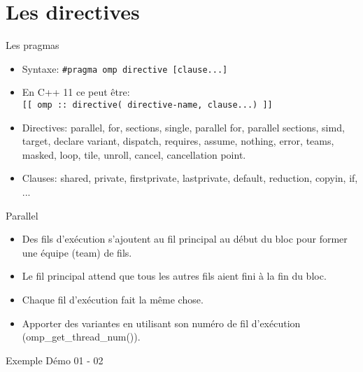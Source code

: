 \documentclass[10pt]{beamer}
\begin{document}
\section{Les directives}

\begin{frame}[fragile]{Les pragmas}

  \begin{itemize}
    \item Syntaxe: \texttt{\#pragma omp directive [clause...]}
    \item En C++ 11 ce peut être: \\\texttt{[[ omp :: directive( directive-name, clause...) ]]}
    \item Directives: parallel, for, sections, single, parallel for, parallel sections, simd, target, declare variant, dispatch, requires, assume, nothing, error, teams, masked, loop, tile, unroll, cancel, cancellation point.
    \item Clauses: shared, private, firstprivate, lastprivate, default, reduction, copyin, if, ...
  \end{itemize}
\end{frame}

\begin{frame}[fragile]{Parallel}

  \begin{itemize}
    \item Des fils d'exécution s'ajoutent au fil principal au début du bloc pour former une équipe (team) de fils.

    \item Le fil principal attend que tous les autres fils aient fini à la fin du bloc.

    \item Chaque fil d'exécution fait la même chose.

    \item Apporter des variantes en utilisant son numéro de fil d'exécution (omp\_get\_thread\_num()).
    
  \end{itemize}
\end{frame}

\begin{frame}[fragile]{Exemple}
Démo 01 - 02
\end{frame}
\end{document}
